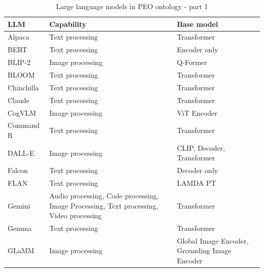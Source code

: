 \begin{table}[H]
    \centering
    \begin{tabular}{|>{\raggedright\arraybackslash}p{4cm}|>{\raggedright\arraybackslash}p{4cm}|>{\raggedright\arraybackslash}p{4cm}|}
        \hline
        \textbf{LLM} & \textbf{Capability} & \textbf{Base model} \\ \hline
        Alpaca & Text processing & Transformer\\ \hline
        BERT & Text processing & Encoder only \\ \hline
        BLIP-2 & Image processing & Q-Former \\ \hline
        BLOOM & Text processing & Transformer \\ \hline
        Chinchilla & Text processing & Transformer \\ \hline
        Claude & Text processing & Transformer \\ \hline
        CogVLM & Image processing & ViT Encoder \\ \hline
        Command R & Text processing & Transformer \\ \hline
        DALL-E & Image processing & CLIP, Decoder, Transformer \\ \hline
        Falcon & Text processing & Decoder only \\ \hline
        FLAN & Text processing & LAMDA PT \\ \hline
        Gemini & Audio processing, Code processing, Image Processing, Text processing, Video processing & Transformer\\ \hline
        Gemma & Text processing & Transformer \\ \hline
        GLaMM & Image processing & Global Image Encoder, Grounding Image Encoder \\ \hline
    \end{tabular}
    \caption{Large language models in PEO ontology - part 1}
\end{table}


